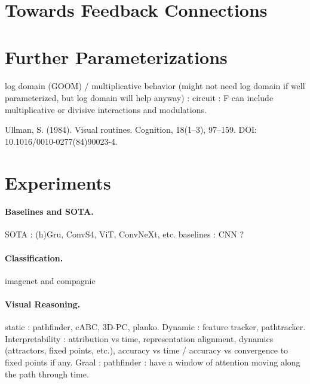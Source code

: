 \documentclass{article}
\begin{document}
\section{Towards Feedback Connections}
\label{sec:ConvSSM_feedback_connections}



\section{Further Parameterizations}

\paragraph{}log domain (GOOM) / multiplicative behavior (might not need log domain if well parameterized, but log domain will help anyway) : circuit : F can include multiplicative or divisive interactions and modulations.

Ullman, S. (1984). Visual routines. Cognition, 18(1–3), 97–159. DOI: 10.1016/0010-0277(84)90023-4. 
\section{Experiments}

\paragraph{Baselines and SOTA.}SOTA : (h)Gru, ConvS4, ViT, ConvNeXt, etc. baselines : CNN ?

\paragraph{Classification.}imagenet and compagnie

\paragraph{Visual Reasoning.}static : pathfinder, cABC, 3D-PC, planko. Dynamic : feature tracker, pathtracker. Interpretability : attribution vs time, representation alignment, dynamics (attractors, fixed points, etc.), accuracy vs time / accuracy vs convergence to fixed points if any. Graal : pathfinder : have a window of attention moving along the path through time.
\end{document}

